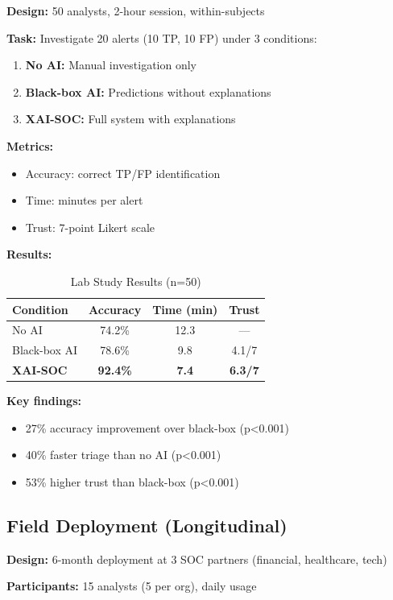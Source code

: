\documentclass[letterpaper,twocolumn,10pt]{article}
\begin{document}
\textbf{Design:} 50 analysts, 2-hour session, within-subjects

\textbf{Task:} Investigate 20 alerts (10 TP, 10 FP) under 3 conditions:
\begin{enumerate}
\item \textbf{No AI:} Manual investigation only
\item \textbf{Black-box AI:} Predictions without explanations
\item \textbf{XAI-SOC:} Full system with explanations
\end{enumerate}

\textbf{Metrics:}
\begin{itemize}
\item Accuracy: correct TP/FP identification
\item Time: minutes per alert
\item Trust: 7-point Likert scale
\end{itemize}

\textbf{Results:}

\begin{table}[h]
\centering
\caption{Lab Study Results (n=50)}
\begin{tabular}{lccc}
\toprule
Condition & Accuracy & Time (min) & Trust \\
\midrule
No AI & 74.2\% & 12.3 & --- \\
Black-box AI & 78.6\% & 9.8 & 4.1/7 \\
\textbf{XAI-SOC} & \textbf{92.4\%} & \textbf{7.4} & \textbf{6.3/7} \\
\bottomrule
\end{tabular}
\end{table}

\textbf{Key findings:}
\begin{itemize}
\item 27\% accuracy improvement over black-box (p<0.001)
\item 40\% faster triage than no AI (p<0.001)
\item 53\% higher trust than black-box (p<0.001)
\end{itemize}

\subsection{Field Deployment (Longitudinal)}

\textbf{Design:} 6-month deployment at 3 SOC partners (financial, healthcare, tech)

\textbf{Participants:} 15 analysts (5 per org), daily usage
\end{document}

